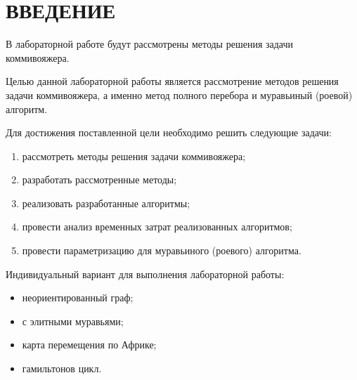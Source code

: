 \section*{\centering ВВЕДЕНИЕ}

В лабораторной работе будут рассмотрены методы решения задачи коммивояжера.

Целью данной лабораторной работы является рассмотрение методов решения задачи коммивояжера, а именно метод полного перебора и муравьиный (роевой) алгоритм.

Для достижения поставленной цели необходимо решить следующие задачи:
\begin{enumerate}
	\item рассмотреть методы решения задачи коммивояжера;
	\item разработать рассмотренные методы;
	\item реализовать разработанные алгоритмы;
	\item провести анализ временных затрат реализованных алгоритмов;
	\item провести параметризацию для муравьиного (роевого) алгоритма.
\end{enumerate}

Индивидуальный вариант для выполнения лабораторной работы:
\begin{itemize}
	\item неориентированный граф;
	\item с элитными муравьями;
	\item карта перемещения по Африке;
	\item гамильтонов цикл.
\end{itemize}
